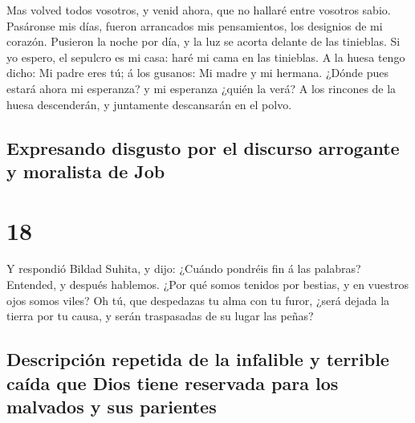  Mas volved todos vosotros, y venid ahora, que no hallaré
entre vosotros sabio.  Pasáronse mis días, fueron
arrancados mis pensamientos, los designios de mi corazón. 
Pusieron la noche por día, y la luz se acorta delante de las tinieblas.
 Si yo espero, el sepulcro es mi casa: haré mi cama en las
tinieblas.  A la huesa tengo dicho: Mi padre eres tú; á los
gusanos: Mi madre y mi hermana.  ¿Dónde pues estará ahora
mi esperanza? y mi esperanza ¿quién la verá?  A los
rincones de la huesa descenderán, y juntamente descansarán en el polvo.

\hypertarget{expresando-disgusto-por-el-discurso-arrogante-y-moralista-de-job}{%
\subsection{Expresando disgusto por el discurso arrogante y moralista de
Job}\label{expresando-disgusto-por-el-discurso-arrogante-y-moralista-de-job}}

\hypertarget{section-17}{%
\section{18}\label{section-17}}

 Y respondió Bildad Suhita, y dijo:  ¿Cuándo
pondréis fin á las palabras? Entended, y después hablemos. 
¿Por qué somos tenidos por bestias, y en vuestros ojos somos viles?
 Oh tú, que despedazas tu alma con tu furor, ¿será dejada la
tierra por tu causa, y serán traspasadas de su lugar las peñas?

\hypertarget{descripciuxf3n-repetida-de-la-infalible-y-terrible-cauxedda-que-dios-tiene-reservada-para-los-malvados-y-sus-parientes}{%
\subsection{Descripción repetida de la infalible y terrible caída que
Dios tiene reservada para los malvados y sus
parientes}\label{descripciuxf3n-repetida-de-la-infalible-y-terrible-cauxedda-que-dios-tiene-reservada-para-los-malvados-y-sus-parientes}}

